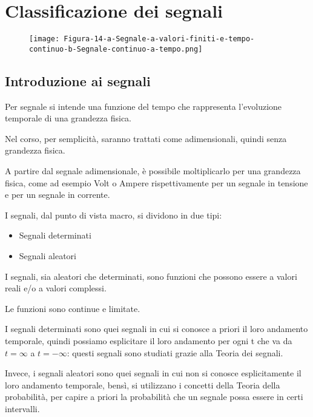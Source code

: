 \chapter{Classificazione dei segnali}

\begin{figure}[h]
    \centering
    \texttt{[image: Figura-14-a-Segnale-a-valori-finiti-e-tempo-continuo-b-Segnale-continuo-a-tempo.png]}
\end{figure}  

\newpage 

\section{Introduzione ai segnali} 

Per segnale si intende una funzione del tempo che rappresenta 
l'evoluzione temporale di una grandezza fisica. \newline 

Nel corso, per semplicità, saranno trattati come adimensionali, quindi senza grandezza fisica. \newline 

A partire dal segnale adimensionale, è possibile moltiplicarlo per una grandezza fisica, come ad esempio Volt o Ampere 
rispettivamente per un segnale in tensione e per un segnale in corrente. \newline 

I segnali, dal punto di vista macro, si dividono in due tipi: 

\begin{itemize}
    \item Segnali determinati 
    \item Segnali aleatori 
\end{itemize}


I segnali, sia aleatori che determinati, 
sono funzioni che possono essere a valori reali e/o a valori complessi. \newline 

Le funzioni sono continue e limitate. \newline 

I segnali determinati sono quei segnali in cui si conosce a priori il loro andamento temporale, 
quindi possiamo esplicitare il loro andamento per ogni t che va da $t = \infty$ a $t = -\infty$: 
questi segnali sono studiati grazie alla Teoria dei segnali. \newline 

Invece, i segnali aleatori sono quei segnali in cui non si conosce esplicitamente il loro andamento temporale, 
bensì, si utilizzano i concetti della Teoria della probabilità, per capire a priori la probabilità che un segnale possa essere in certi intervalli. \newline

